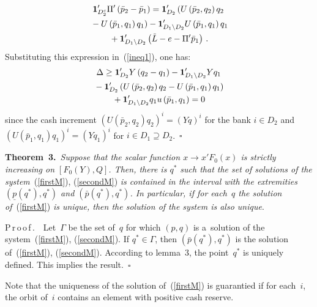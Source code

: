 \begin{multicols}{2}
\columnbreak

\noindent
\begin{multline*}
 {\bf 1}'_{D_2^c}\Pi'\left(\bar p_2-
 \bar p_1\right)={\bf 1}'_{D_2}\left(U\left(\bar p_2,q_2\right)q_2\right.\\
 \left.{}-
 U\left(\bar p_1,q_1\right)q_1\right)-{\bf  1}'_{D_1\setminus D_2}
 U\left(\bar p_1,q_1\right)q_1\\
{}+{\bf 1}'_{D_1\setminus D_2}\left(\tilde L-e -\Pi'\bar p_1\right)\,.
\end{multline*}
Substituting this expression in~(\ref{ineq1}), one has:
\begin{multline*}
\Delta\ge{\bf 1}'_{D_2}Y\left(q_2-q_1\right)-{\bf 1}'_{D_1\setminus D_2}Yq_1\\
{}-{\bf 1}'_{D_2}\left(U\left(
\bar p_2,q_2\right)q_2-U\left(\bar p_1,q_1\right)q_1\right)\\
{}+
{\bf 1}'_{D_1\setminus D_2}q_1u\left(\bar p_1,q_1\right)=0
\end{multline*}
since the cash increment $(U(\bar p_2,q_2)q_2)^i=(Yq)^i$ for the bank $i\in D_2$ 
and $(U(\bar p_1,q_1)q_1)^i=(Yq_1)^i$ for $i\in D_1\supseteq D_2$.~$\square$


\smallskip

\noindent
\textbf{Theorem~3.}\
\textit{Suppose that the scalar function $x\to x'F_0(x)$ is strictly increasing on 
$[F_0(Y),Q]$. Then, there is $q^*$ such that  the set of solutions of the 
system}~(\ref{firstM}),  (\ref{secondM})
\textit{is contained in the interval  with the extremities $(\underline p(q^*),q^*)$ and 
$(\bar p(q^*),q^*)$.
In particular, if for each~$q$ the solution of}~(\ref{firstM}) \textit{is unique, then 
the solution of the system is also unique}.

\smallskip

\noindent
P\,r\,o\,o\,f\,.\ \ 
Let~$\Gamma$ be the set of~$q$ for which $(p,q)$ is a~solution  of 
the system~(\ref{firstM}),  (\ref{secondM}). If $q^*\in \Gamma$, then $(\bar 
p(q^*),q^*)$
is the solution of~(\ref{firstM}),  (\ref{secondM}). According to  
lemma~3, the point~$q^*$ is uniquely defined. This implies the result.~$\square$

\smallskip

Note that the uniqueness of the solution of~(\ref{firstM}) is guarantied if  for 
each~$i$,
the orbit of~$i$ contains an element with positive cash reserve.

\smallskip


\end{multicols}
